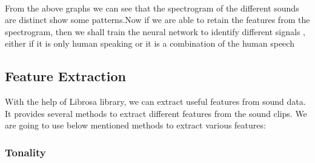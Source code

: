 \documentclass[11pt]{article}
\begin{document}
    \begin{center}
    \end{center}
    { \hspace*{\fill} \\}
    
    From the above graphs we can see that the spectrogram of the different
sounds are distinct show some patterns.Now if we are able to retain the
features from the spectrogram, then we shall train the neural network to
identify different signals , either if it is only human speaking or it
is a combination of the human speech

    \hypertarget{feature-extraction}{%
\subsection{\texorpdfstring{Feature
Extraction}{Feature Extraction }}\label{feature-extraction}}

With the help of Librosa library, we can extract useful features from
sound data. It provides several methods to extract different features
from the sound clips. We are going to use below mentioned methods to
extract various features:

\hypertarget{tonality}{%
\subsubsection{\texorpdfstring{Tonality}{Tonality }}\label{tonality}}
\end{document}
